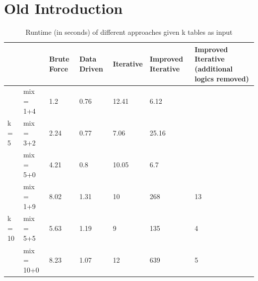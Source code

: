 
\chapter{Old Introduction}
\label{ch:OldIntroduction}


\begin{table}[h!]
    \centering
    \scriptsize
    \begin{center}
      \caption{Runtime (in seconds) of different approaches given k tables as input}
      \label{tab:Runtime-of-different-approaches-given-k-tables-as-input}
      \begin{tabular}{|p{}|p{}|p{}|p{}|p{}|p{}|p{}|}  
        \hline
         & & \textbf{Brute Force} & \textbf{Data Driven} & \textbf{Iterative} & \textbf{Improved Iterative} & \textbf{Improved Iterative (additional logics removed)}\\
        \hline
        \multirow{3}{*}{k = 5} & mix = 1+4 & 1.2 & 0.76 & 12.41 & 6.12 & \\
        \cline{2-7}
        & mix = 3+2 & 2.24 & 0.77 & 7.06 & 25.16 & \\
        \cline{2-7}
        & mix = 5+0 & 4.21 & 0.8 & 10.05 & 6.7 & \\
        \hline        
        \multirow{3}{*}{k = 10} & mix = 1+9 & 8.02 & 1.31 & 10 & 268 & 13 \\
        \cline{2-7}
        & mix = 5+5 & 5.63 & 1.19 & 9 & 135 & 4 \\
        \cline{2-7}
        & mix = 10+0 & 8.23 & 1.07 & 12 & 639 & 5 \\
        \hline
      \end{tabular}
    \end{center}
\end{table}


